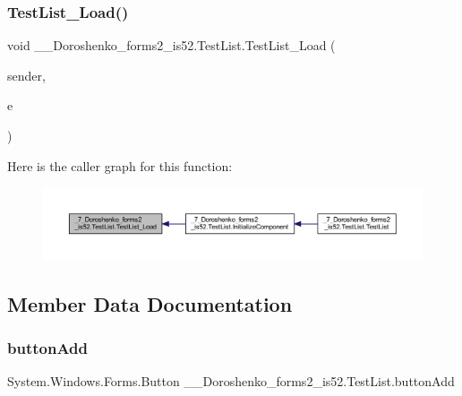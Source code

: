 \subsubsection{\texorpdfstring{Test\+List\+\_\+\+Load()}{TestList\_Load()}}
{\footnotesize\ttfamily void \+\_\+\_\+\+Doroshenko\+\_\+forms2\+\_\+is52.\+Test\+List.\+Test\+List\+\_\+\+Load (\begin{DoxyParamCaption}\item[{object}]{sender,  }\item[{Event\+Args}]{e }\end{DoxyParamCaption})\hspace{0.3cm}{\ttfamily [private]}}

Here is the caller graph for this function\+:
\nopagebreak
\begin{figure}[H]
\begin{center}
\leavevmode
\includegraphics[width=350pt]{class__7___doroshenko__forms2__is52_1_1_test_list_afcb94184c5a8e2b33b48961aee888668_icgraph}
\end{center}
\end{figure}


\subsection{Member Data Documentation}
\hypertarget{class__7___doroshenko__forms2__is52_1_1_test_list_a37b4b6e275fe7ca348d05ee54639e0e9}{}\label{class__7___doroshenko__forms2__is52_1_1_test_list_a37b4b6e275fe7ca348d05ee54639e0e9} 
\subsubsection{\texorpdfstring{button\+Add}{buttonAdd}}
{\footnotesize\ttfamily System.\+Windows.\+Forms.\+Button \+\_\+\_\+\+Doroshenko\+\_\+forms2\+\_\+is52.\+Test\+List.\+button\+Add\hspace{0.3cm}{\ttfamily [private]}}


